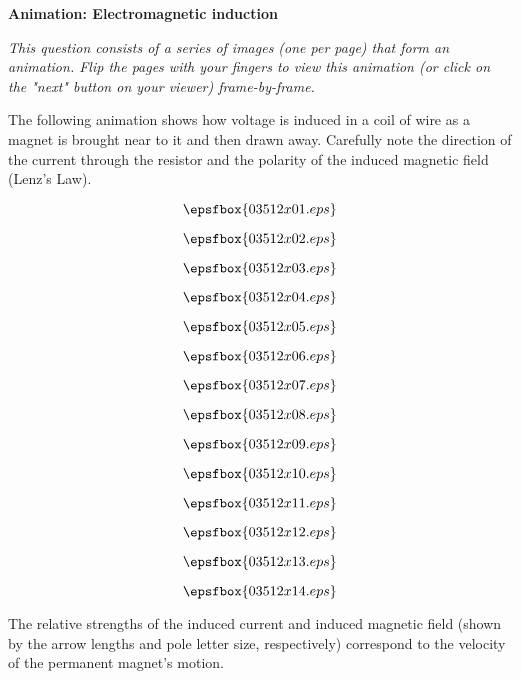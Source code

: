 

\centerline{\bf Animation: Electromagnetic induction}

\vskip 10pt

{\it This question consists of a series of images (one per page) that form an animation.  Flip the pages with your fingers to view this animation (or click on the "next" button on your viewer) frame-by-frame.}

\vskip 10pt

The following animation shows how voltage is induced in a coil of wire as a magnet is brought near to it and then drawn away.  Carefully note the direction of the current through the resistor and the polarity of the induced magnetic field (Lenz's Law).

\vfil \eject
$$\epsfbox{03512x01.eps}$$

\vfil \eject
$$\epsfbox{03512x02.eps}$$

\vfil \eject
$$\epsfbox{03512x03.eps}$$

\vfil \eject
$$\epsfbox{03512x04.eps}$$

\vfil \eject
$$\epsfbox{03512x05.eps}$$

\vfil \eject
$$\epsfbox{03512x06.eps}$$

\vfil \eject
$$\epsfbox{03512x07.eps}$$

\vfil \eject
$$\epsfbox{03512x08.eps}$$

\vfil \eject
$$\epsfbox{03512x09.eps}$$

\vfil \eject
$$\epsfbox{03512x10.eps}$$

\vfil \eject
$$\epsfbox{03512x11.eps}$$

\vfil \eject
$$\epsfbox{03512x12.eps}$$

\vfil \eject
$$\epsfbox{03512x13.eps}$$

\vfil \eject
$$\epsfbox{03512x14.eps}$$


\vfil \eject







The relative strengths of the induced current and induced magnetic field (shown by the arrow lengths and pole letter size, respectively) correspond to the velocity of the permanent magnet's motion.

